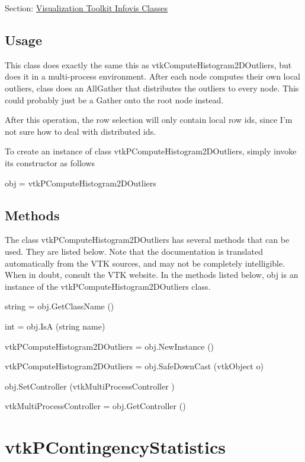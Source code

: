 Section\-: \hyperlink{sec_vtkinfovis}{Visualization Toolkit Infovis Classes} \hypertarget{vtkwidgets_vtkxyplotwidget_Usage}{}\subsection{Usage}\label{vtkwidgets_vtkxyplotwidget_Usage}
This class does exactly the same this as vtk\-Compute\-Histogram2\-D\-Outliers, but does it in a multi-\/process environment. After each node computes their own local outliers, class does an All\-Gather that distributes the outliers to every node. This could probably just be a Gather onto the root node instead.

After this operation, the row selection will only contain local row ids, since I'm not sure how to deal with distributed ids.

To create an instance of class vtk\-P\-Compute\-Histogram2\-D\-Outliers, simply invoke its constructor as follows \begin{DoxyVerb}  obj = vtkPComputeHistogram2DOutliers
\end{DoxyVerb}
 \hypertarget{vtkwidgets_vtkxyplotwidget_Methods}{}\subsection{Methods}\label{vtkwidgets_vtkxyplotwidget_Methods}
The class vtk\-P\-Compute\-Histogram2\-D\-Outliers has several methods that can be used. They are listed below. Note that the documentation is translated automatically from the V\-T\-K sources, and may not be completely intelligible. When in doubt, consult the V\-T\-K website. In the methods listed below, {\ttfamily obj} is an instance of the vtk\-P\-Compute\-Histogram2\-D\-Outliers class. 
\begin{DoxyItemize}
\item {\ttfamily string = obj.\-Get\-Class\-Name ()}  
\item {\ttfamily int = obj.\-Is\-A (string name)}  
\item {\ttfamily vtk\-P\-Compute\-Histogram2\-D\-Outliers = obj.\-New\-Instance ()}  
\item {\ttfamily vtk\-P\-Compute\-Histogram2\-D\-Outliers = obj.\-Safe\-Down\-Cast (vtk\-Object o)}  
\item {\ttfamily obj.\-Set\-Controller (vtk\-Multi\-Process\-Controller )}  
\item {\ttfamily vtk\-Multi\-Process\-Controller = obj.\-Get\-Controller ()}  
\end{DoxyItemize}\hypertarget{vtkinfovis_vtkpcontingencystatistics}{}\section{vtk\-P\-Contingency\-Statistics}\label{vtkinfovis_vtkpcontingencystatistics}
